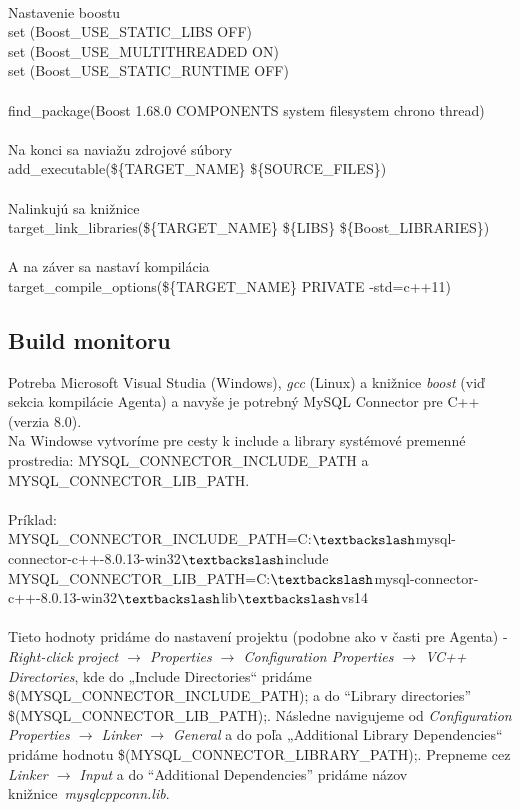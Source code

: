 \documentclass[a4paper,12pt]{article}
\begin{document}
\\
Nastavenie boostu  \\
set (Boost\_USE\_STATIC\_LIBS OFF) \\
set (Boost\_USE\_MULTITHREADED ON) \\
set (Boost\_USE\_STATIC\_RUNTIME OFF) \\ \\
find\_package(Boost 1.68.0 COMPONENTS system filesystem chrono thread) \\ \\
Na konci sa naviažu zdrojové súbory \\
add\_executable(\$\{TARGET\_NAME\} \$\{SOURCE\_FILES\}) \\ \\
Nalinkujú sa knižnice  \\
target\_link\_libraries(\$\{TARGET\_NAME\} \$\{LIBS\} \$\{Boost\_LIBRARIES\}) \\ \\
A na záver sa nastaví kompilácia \\
target\_compile\_options(\$\{TARGET\_NAME\} PRIVATE -std=c++11) \\

\subsection{Build monitoru}
Potreba Microsoft Visual Studia (Windows), \textit{gcc} (Linux) a knižnice \textit{boost} (viď sekcia kompilácie Agenta) a navyše je potrebný MySQL Connector pre C++ (verzia 8.0). \\

Na Windowse vytvoríme pre cesty k include a library systémové premenné prostredia: MYSQL\_CONNECTOR\_INCLUDE\_PATH a MYSQL\_CONNECTOR\_LIB\_PATH. \\ \\
Príklad: \\
MYSQL\_CONNECTOR\_INCLUDE\_PATH=C:$\textbackslash$mysql-connector-c++-8.0.13-win32$\textbackslash$include \\
MYSQL\_CONNECTOR\_LIB\_PATH=C:$\textbackslash$mysql-connector-c++-8.0.13-win32$\textbackslash$lib$\textbackslash$vs14 \\ \\

Tieto hodnoty pridáme do nastavení projektu (podobne ako v časti pre Agenta) - \textit{Right-click project $\rightarrow$ Properties $\rightarrow$ Configuration Properties $\rightarrow$ VC++ Directories}, kde do „Include Directories“ pridáme \$(MYSQL\_CONNECTOR\_INCLUDE\_PATH); a do “Library directories” \$(MYSQL\_CONNECTOR\_LIB\_PATH);. Následne navigujeme od \textit{Configuration Properties $\rightarrow$ Linker $\rightarrow$ General} a do poľa „Additional Library Dependencies“ pridáme hodnotu \$(MYSQL\_CONNECTOR\_LIBRARY\_PATH);. Prepneme cez \textit{Linker $\rightarrow$ Input} a do “Additional Dependencies” pridáme názov knižnice~\textit{mysqlcppconn.lib}. \\ 
\end{document}
